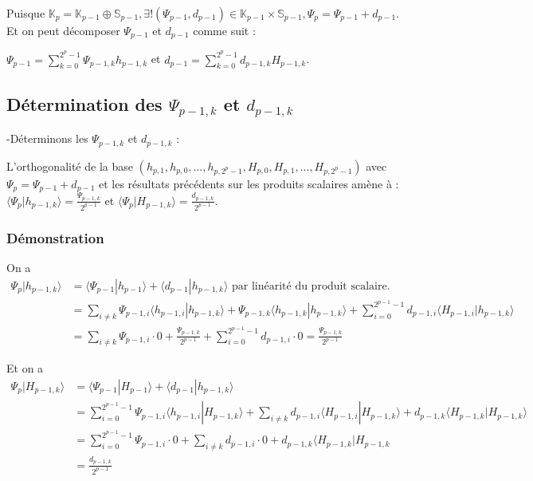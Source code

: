\documentclass{article}
\begin{document}
Puisque $\mathbb{K}_{p} = \mathbb{K}_{p-1} \oplus \mathbb{S}_{p-1}, \exists{}!(\Psi{}_{p-1},d_{p-1}) \in \mathbb{K}_{p-1} \times \mathbb{S}_{p-1}, \Psi{}_p = \Psi{}_{p-1} + d_{p-1} $. \\

Et on peut décomposer $\Psi{}_{p-1}$ et $d_{p-1}$ comme suit :

$\displaystyle \Psi{}_{p-1} = \sum_{k=0}^{2^p - 1} \Psi{}_{p-1,k}h_{p-1,k}$ et $d_{p-1} = \sum_{k=0}^{2^p - 1} d_{p-1,k}H_{p-1,k}$. \\

\subsection{Détermination des $\Psi{}_{p-1,k}$ et $d_{p-1,k}$}

-Déterminons les $\Psi{}_{p-1,k}$ et $d_{p-1,k}$ :

L'orthogonalité de la base $(h_{p,1},h_{p,0},...,h_{p,2^p - 1},H_{p,0},H_{p,1},...,H_{p,2^p - 1})$ avec $\Psi{}_{p} = \Psi{}_{p-1} + d_{p-1}$ et les résultats précédents sur les produits scalaires amène à : $\langle \Psi{}_{p}|h_{p-1,k} \rangle = \frac{\Psi{}_{p-1,k}}{2^{p-1}}$ et $\langle \Psi{}_{p}|H_{p-1,k} \rangle = \frac{d_{p-1,k}}{2^{p-1}}$. \\

\subsubsection{Démonstration} 

On a \begin{align*}
 \Psi{}_{p}|h_{p-1,k} \rangle &= \langle \Psi{}_{p-1}|h_{p-1}\rangle + \langle d_{p-1}|h_{p-1,k} \rangle  \text{ par linéarité du produit scalaire.} \\
 &= \sum_{i \neq k} \Psi{}_{p-1,i} \langle h_{p-1,i}|h_{p-1,k} \rangle + \Psi{}_{p-1,k} \langle h_{p-1,k}|h_{p-1,k} \rangle + \sum_{i=0}^{2^{p-1} - 1} d_{p-1,i}\langle H_{p-1,i}|h_{p-1,k} \rangle  \\
 &= \sum_{i \neq k} \Psi{}_{p-1,i}\cdot{}0 + \frac{\Psi{}_{p-1,k}}{2^{p-1}} + \sum_{i=0}^{2^{p-1} - 1} d_{p-1,i}\cdot{}0 = \frac{\Psi{}_{p-1,k}}{2^{p-1}} 
 \end{align*}

Et on a 
\begin{align*} \displaystyle
 \Psi{}_{p}|H_{p-1,k} \rangle &= \langle \Psi{}_{p-1}|H_{p-1}\rangle + \langle d_{p-1}|h_{p-1,k} \rangle  \\
&= \sum_{i=0}^{2^{p-1}-1} \Psi{}_{p-1,i}\langle h_{p-1,i}|H_{p-1,k}\rangle + \sum_{i \neq k}d_{p-1,i}\langle{}H_{p-1,i}|H_{p-1,k} \rangle + d_{p-1,k}\langle{}H_{p-1,k}|H_{p-1,k}\rangle  \\
&= \sum_{i=0}^{2^{p-1}-1}\Psi{}_{p-1,i}\cdot{}0 + \sum_{i \neq k}d_{p-1,i}\cdot{}0 + d_{p-1,k}\langle{}H_{p-1,k}|H_{p-1,k} \\ &= \frac{d_{p-1,k}}{2^{p-1}}
\end{align*} \\
\end{document}
